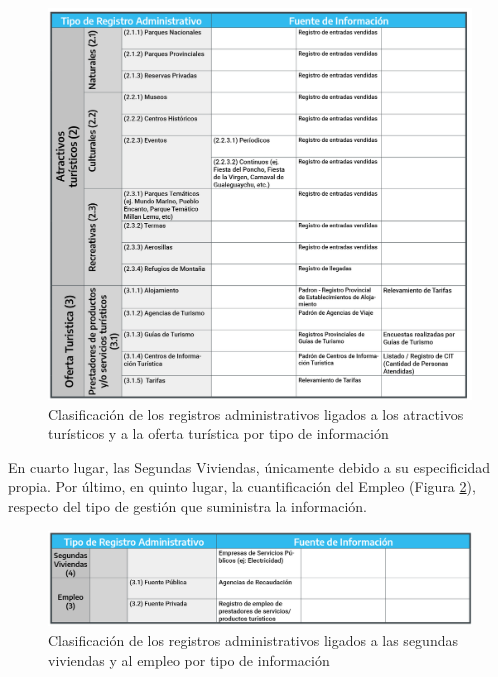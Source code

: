\documentclass[
]{book}
\begin{document}
\begin{figure}

{\centering \includegraphics[width=1\linewidth]{imagenes/figura03B} 

}

\caption{Clasificación de los registros administrativos ligados a los atractivos turísticos y a la oferta turística por tipo de información}\label{fig:clasificacionatractivos}
\end{figure}

En cuarto lugar, las Segundas Viviendas, únicamente debido a su especificidad propia. Por último, en quinto lugar, la cuantificación del Empleo (Figura \ref{fig:clasificacionsegundasviviendas}), respecto del tipo de gestión que suministra la información.

\begin{figure}

{\centering \includegraphics[width=1\linewidth]{imagenes/figura03C} 

}

\caption{Clasificación de los registros administrativos ligados a las segundas viviendas y al empleo por tipo de información}\label{fig:clasificacionsegundasviviendas}
\end{figure}
\end{document}
